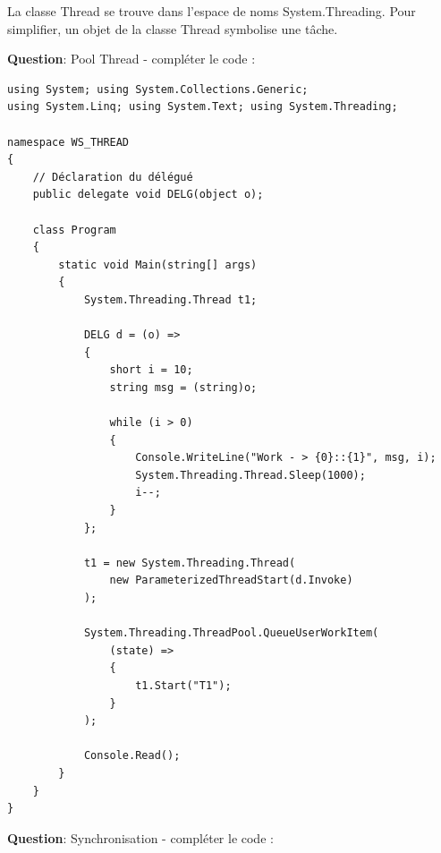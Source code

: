 \vspace{0.5cm}

\noindent La classe Thread se trouve dans l'espace de noms System.Threading. Pour simplifier, un objet de la classe Thread symbolise une tâche.
\newpage

\noindent \textbf{Question}: Pool Thread - compléter le code :

\begin{verbatim}
using System; using System.Collections.Generic;
using System.Linq; using System.Text; using System.Threading;

namespace WS_THREAD
{
    // Déclaration du délégué
    public delegate void DELG(object o);

    class Program
    {
        static void Main(string[] args)
        {
            System.Threading.Thread t1;

            DELG d = (o) =>
            {
                short i = 10;
                string msg = (string)o;

                while (i > 0)
                {
                    Console.WriteLine("Work - > {0}::{1}", msg, i);
                    System.Threading.Thread.Sleep(1000);
                    i--;
                }
            };

            t1 = new System.Threading.Thread(
                new ParameterizedThreadStart(d.Invoke)
            );

            System.Threading.ThreadPool.QueueUserWorkItem(
                (state) =>
                {
                    t1.Start("T1");
                }
            );

            Console.Read();
        }
    }
}
\end{verbatim}

\newpage

\noindent \textbf{Question}: Synchronisation - compléter le code :


